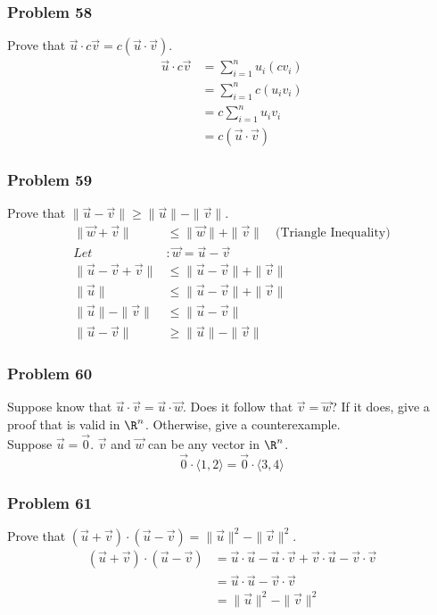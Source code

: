 \documentclass[letterpaper, 12pt]{math}
\begin{document}
\subsubsection*{Problem 58}
Prove that \( \vec{u}\cdot c\vec{v} = c(\vec{u}\cdot\vec{v}) \).
\begin{align*}
  \vec{u}\cdot c\vec{v} &= \sum_{i=1}^{n}u_{i}(cv_{i}) \\
  &= \sum_{i=1}^{n}c(u_{i}v_{i}) \\
  &= c\sum_{i=1}^{n}u_{i}v_{i} \\
  &= c(\vec{u}\cdot\vec{v})
\end{align*}

\subsubsection*{Problem 59}
Prove that \( \|\vec{u}-\vec{v}\| \ge \|\vec{u}\|-\|\vec{v}\| \).
\begin{align*}
  \|\vec{w}+\vec{v}\| &\le \|\vec{w}\|+\|\vec{v}\|
    \quad\text{(Triangle Inequality)} \\
  Let&: \vec{w} = \vec{u}-\vec{v} \\
  \|\vec{u}-\vec{v}+\vec{v}\| &\le \|\vec{u}-\vec{v}\|+\|\vec{v}\| \\
  \|\vec{u}\| &\le \|\vec{u}-\vec{v}\|+\|\vec{v}\| \\
  \|\vec{u}\|-\|\vec{v}\| &\le \|\vec{u}-\vec{v}\| \\
  \|\vec{u}-\vec{v}\| &\ge \|\vec{u}\|-\|\vec{v}\|
\end{align*}

\subsubsection*{Problem 60}
Suppose know that \( \vec{u}\cdot\vec{v} = \vec{u}\cdot\vec{w} \). Does it
follow that \( \vec{v} = \vec{w} \)? If it does, give a proof that is valid
in \( \R^n \). Otherwise, give a counterexample. \\
Suppose \( \vec{u} = \vec{0} \). \( \vec{v} \) and \( \vec{w} \) can be any
vector in \( \R^n \).
\[ \vec{0}\cdot\langle1,2\rangle = \vec{0}\cdot\langle3,4\rangle \]

\subsubsection*{Problem 61}
Prove that \( (\vec{u}+\vec{v})\cdot(\vec{u}-\vec{v}) =
\|\vec{u}\|^2-\|\vec{v}\|^2 \).
\begin{align*}
  (\vec{u}+\vec{v})\cdot(\vec{u}-\vec{v}) &= \vec{u}\cdot\vec{u}-
    \vec{u}\cdot\vec{v}+\vec{v}\cdot\vec{u}-\vec{v}\cdot\vec{v} \\
  &= \vec{u}\cdot\vec{u}-\vec{v}\cdot\vec{v} \\
  &= \|\vec{u}\|^2-\|\vec{v}\|^2
\end{align*}
\end{document}
